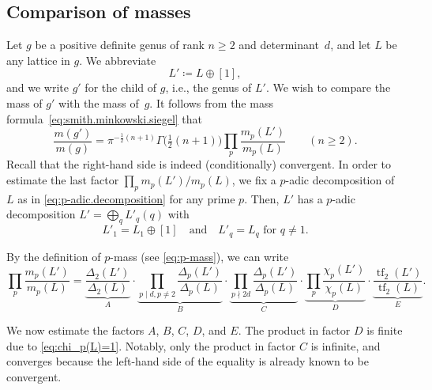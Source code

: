\documentclass[a4paper]{amsart}
\theoremstyle{definition}
\theoremstyle{plain}
\DeclareMathOperator{\tf}{tf}
\begin{document}
\subsection{Comparison of masses} \label{subsec:comparison.masses}
Let \(g\) be a positive definite genus of rank \(n \geq 2\) and determinant~\(d\), and let \(L\) be any lattice in \(g\).
We abbreviate 
\[
    L' \coloneqq L \oplus [1],
\]
and we write \(g'\) for the child of \(g\), i.e., the genus of \(L'\). We wish to compare the mass of \(g'\) with the mass of~\(g\). 
It follows from the mass formula~\eqref{eq:smith.minkowski.siegel} that
\begin{equation} \label{eq:comparison.masses}
    \frac{m(g')}{m(g)} = \pi^{-\frac{1}{2}(n+1)} \Gamma\big(\tfrac{1}{2}(n+1)\big) \prod_p \frac{m_p(L')}{m_p(L)} \qquad (n \geq 2).
\end{equation}
Recall that the right-hand side is indeed (conditionally) convergent.
In order to estimate the last factor \(\prod_p m_p(L')/m_p(L)\), we fix a \(p\)-adic decomposition of~\(L\) as in \eqref{eq:p-adic.decomposition} for any prime \(p\). 
Then, \(L'\) has a \(p\)-adic decomposition \(L' = \bigoplus_q L'_q(q)\) with 
\begin{equation} \label{eq:L'_q}
    L'_1 = L_1 \oplus [1] \quad \text{and} \quad L'_q = L_q \text{ for \(q \neq 1\)}.
\end{equation}

By the definition of \(p\)-mass (see \eqref{eq:p-mass}), we can write
\begin{equation} \label{eq:ABCDE}
    \prod_p \frac{m_p(L')}{m_p(L)} 
    =       \underbrace{\frac{\Delta_2(L')}{\Delta_2(L)}}_A
    \cdot   \underbrace{\prod_{p \mid d, p\neq 2} \frac{\Delta_p(L')}{\Delta_p(L)}}_B
    \cdot   \underbrace{\prod_{p \nmid 2d} \frac{\Delta_p(L')}{\Delta_p(L)}}_C
    \cdot \underbrace{\prod_p \frac{\chi_p(L')}{\chi_p(L)}}_D
    \cdot \underbrace{\frac{\tf_2(L')}{\tf_2(L)}}_E.
\end{equation}

We now estimate the factors \(A\), \(B\), \(C\), \(D\), and \(E\). The product in factor \(D\) is finite due to \eqref{eq:chi_p(L)=1}. Notably, only the product in factor \(C\) is infinite, and converges because the left-hand side of the equality is already known to be convergent.
\end{document}
